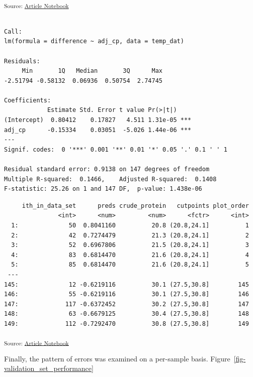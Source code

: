 \documentclass[
]{agujournal2019}
\begin{document}
\textsubscript{Source:
\href{https://rvcrawford.github.io/glowing-system/index-preview.html}{Article
Notebook}}

\begin{verbatim}

Call:
lm(formula = difference ~ adj_cp, data = temp_dat)

Residuals:
     Min       1Q   Median       3Q      Max 
-2.51794 -0.58132  0.06936  0.50754  2.74745 

Coefficients:
            Estimate Std. Error t value Pr(>|t|)    
(Intercept)  0.80412    0.17827   4.511 1.31e-05 ***
adj_cp      -0.15334    0.03051  -5.026 1.44e-06 ***
---
Signif. codes:  0 '***' 0.001 '**' 0.01 '*' 0.05 '.' 0.1 ' ' 1

Residual standard error: 0.9138 on 147 degrees of freedom
Multiple R-squared:  0.1466,    Adjusted R-squared:  0.1408 
F-statistic: 25.26 on 1 and 147 DF,  p-value: 1.438e-06
\end{verbatim}

\begin{verbatim}
     ith_in_data_set      preds crude_protein   cutpoints plot_order
               <int>      <num>         <num>      <fctr>      <int>
  1:              50  0.8041160          20.8 (20.8,24.1]          1
  2:              42  0.7274479          21.3 (20.8,24.1]          2
  3:              52  0.6967806          21.5 (20.8,24.1]          3
  4:              83  0.6814470          21.6 (20.8,24.1]          4
  5:              85  0.6814470          21.6 (20.8,24.1]          5
 ---                                                                
145:              12 -0.6219116          30.1 (27.5,30.8]        145
146:              55 -0.6219116          30.1 (27.5,30.8]        146
147:             117 -0.6372452          30.2 (27.5,30.8]        147
148:              63 -0.6679125          30.4 (27.5,30.8]        148
149:             112 -0.7292470          30.8 (27.5,30.8]        149
\end{verbatim}

\textsubscript{Source:
\href{https://rvcrawford.github.io/glowing-system/index-preview.html}{Article
Notebook}}

Finally, the pattern of errors was examined on a per-sample basis.
Figure~\ref{fig-validation_set_performance}
\end{document}
